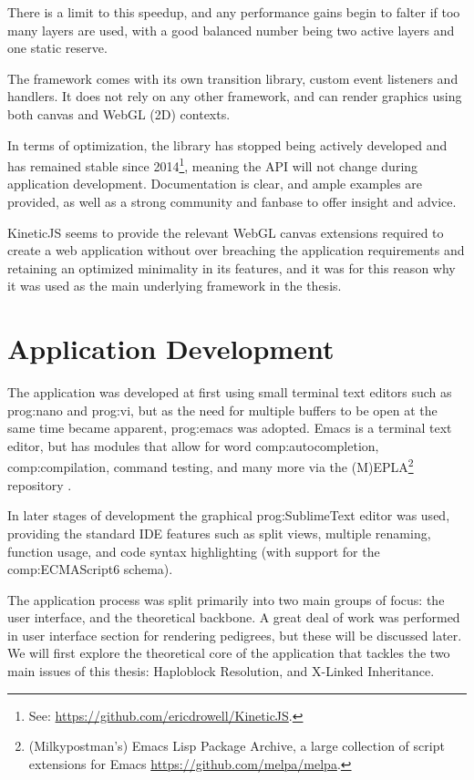 There is a limit to this speedup, and any performance gains begin to falter if too many layers are used, with a good balanced number being two active layers and one static reserve.

The framework comes with its own transition library, custom event listeners and handlers. It does not rely on any other framework, and can render graphics using both canvas and WebGL (2D) contexts.

In terms of optimization, the library has stopped being actively developed and has remained stable since 2014\footnote{See: \url{https://github.com/ericdrowell/KineticJS}.}, meaning the API will not change during application development. Documentation is clear, and ample examples are provided, as well as a strong community and fanbase to offer insight and advice.

KineticJS seems to provide the relevant WebGL canvas extensions required to create a web application without over breaching the application requirements and retaining an optimized minimality in its features, and it was for this reason why it was used as the main underlying framework in the thesis.

\section{Application Development}

The application was developed at first using small terminal text editors such as \gls{prog:nano} and \gls{prog:vi}, but as the need for multiple buffers to be open at the same time became apparent, \gls{prog:emacs} was adopted. Emacs is a terminal text editor, but has modules that allow for word \gls{comp:autocompletion}, \gls{comp:compilation}, command testing, and many more via the (M)EPLA\footnote{(Milkypostman's) Emacs Lisp Package Archive, a large collection of script extensions for Emacs \url{https://github.com/melpa/melpa}.} repository \cite{stallman1981emacs}.

In later stages of development the graphical \gls{prog:SublimeText} editor was used, providing the standard IDE features such as split views, multiple renaming, function usage, and code syntax highlighting (with support for the \gls{comp:ECMAScript6} schema).

The application process was split primarily into two main groups of focus: the user interface, and the theoretical backbone. A great deal of work was performed in user interface section for rendering pedigrees, but these will be discussed later. We will first explore the theoretical core of the application that tackles the two main issues of this thesis: Haploblock Resolution, and X-Linked Inheritance. 


